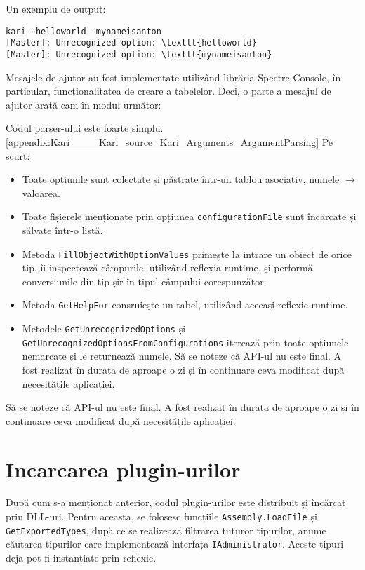 \documentclass[a4paper,12pt]{report}
\begin{document}
Un exemplu de output:

\begin{verbatim}
kari -helloworld -mynameisanton
[Master]: Unrecognized option: \texttt{helloworld}
[Master]: Unrecognized option: \texttt{mynameisanton}
\end{verbatim}


Mesajele de ajutor au fost implementate utilizând librăria Spectre Console\cite{spectre_console_github}, în particular, funcționalitatea de creare a tabelelor.
Deci, o parte a mesajul de ajutor arată cam în modul următor:

Codul parser-ului este foarte simplu.
\ref{appendix:Kari____Kari_source_Kari_Arguments_ArgumentParsing}
Pe scurt:

\begin{itemize}
  \item Toate opțiunile sunt colectate și păstrate într-un tablou asociativ, numele $\rightarrow$ valoarea.
  \item Toate fișierele menționate prin opțiunea \texttt{configurationFile} sunt încărcate și sălvate într-o listă.
  \item Metoda \texttt{FillObjectWithOptionValues} primește la intrare un obiect de orice tip, îi inspectează câmpurile, utilizând reflexia runtime, și performă conversiunile din tip șir în tipul câmpului corespunzător.
  \item Metoda \texttt{GetHelpFor} consruiește un tabel, utilizând aceeași reflexie runtime.
  \item Metodele \texttt{GetUnrecognizedOptions} și \texttt{GetUnrecognizedOptionsFromConfigurations} iterează prin toate opțiunele nemarcate și le returnează numele.
  Să se noteze că API-ul nu este final.
  A fost realizat în durata de aproape o zi și în continuare ceva modificat după necesitățile aplicației.
\end{itemize}

Să se noteze că API-ul nu este final.
A fost realizat în durata de aproape o zi și în continuare ceva modificat după necesitățile aplicației.


\section{Incarcarea plugin-urilor}

După cum s-a menționat anterior, codul plugin-urilor este distribuit și încărcat prin DLL-uri.
Pentru aceasta, se folosesc funcțiile \texttt{Assembly.LoadFile} și \texttt{GetExportedTypes}, după ce se realizează filtrarea tuturor tipurilor, anume căutarea tipurilor care implementează interfața \texttt{IAdministrator}.
Aceste tipuri deja pot fi instanțiate prin reflexie.
\end{document}
